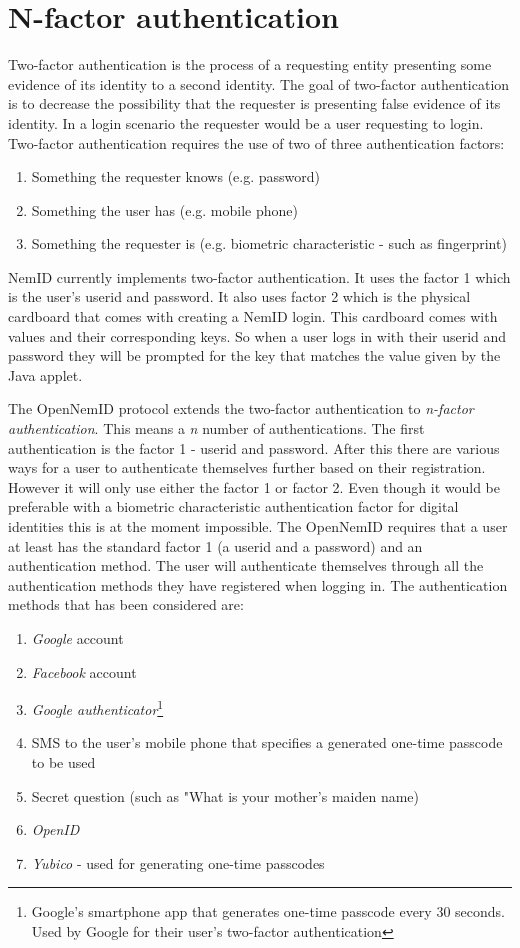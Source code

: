 \documentclass[twosided]{report}
\begin{document}
\section{N-factor authentication}
\label{sect:nfactauth}
Two-factor authentication is the process of a requesting entity presenting some evidence of its identity to a second identity. The goal of two-factor authentication is to decrease the possibility that the requester is presenting false evidence of its identity. In a login scenario the requester would be a user requesting to login. Two-factor authentication requires the use of two of three authentication factors:
\begin{enumerate}
\item Something the requester knows (e.g. password)
\item Something the user has (e.g. mobile phone)
\item Something the requester is (e.g. biometric characteristic - such as fingerprint)
\end{enumerate}
\par
NemID currently implements two-factor authentication. It uses the factor 1 which is the user's userid and password. It also uses factor 2 which is the physical cardboard that comes with creating a NemID login. This cardboard comes with values and their corresponding keys. So when a user logs in with their userid and password they will be prompted for the key that matches the value given by the Java applet.
\par
The OpenNemID protocol extends the two-factor authentication to \emph{n-factor authentication}. This means a \emph{n} number of authentications. The first authentication is the factor 1 - userid and password. After this there are various ways for a user to authenticate themselves further based on their registration. However it will only use either the factor 1 or factor 2. Even though it would be preferable with a biometric characteristic authentication factor for digital identities this is at the moment impossible. The OpenNemID requires that a user at least has the standard factor 1 (a userid and a password) and an authentication method. The user will authenticate themselves through all the authentication methods they have registered when logging in. The authentication methods that has been considered are:
\begin{enumerate}
\item \emph{Google} account
\item \emph{Facebook} account
\item \emph{Google authenticator}\footnote{Google's smartphone app that generates one-time passcode every 30 seconds. Used by Google for their user's two-factor authentication}
\item SMS to the user's mobile phone that specifies a generated one-time passcode to be used
\item Secret question (such as "What is your mother's maiden name)
\item \emph{OpenID}
\item \emph{Yubico} - used for generating one-time passcodes
\end{enumerate}
\end{document}

